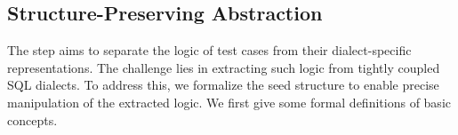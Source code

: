 \documentclass[sigconf,review,anonymous]{acmart}
\begin{document}




\subsection{Structure-Preserving Abstraction}
\label{sec:abstraction}
The step aims to separate the logic of test cases from their dialect-specific representations. The challenge lies in extracting such logic from tightly coupled SQL dialects. To address this, we formalize the seed structure to enable precise manipulation of the extracted logic. We first give some formal definitions of basic concepts.
\end{document}
